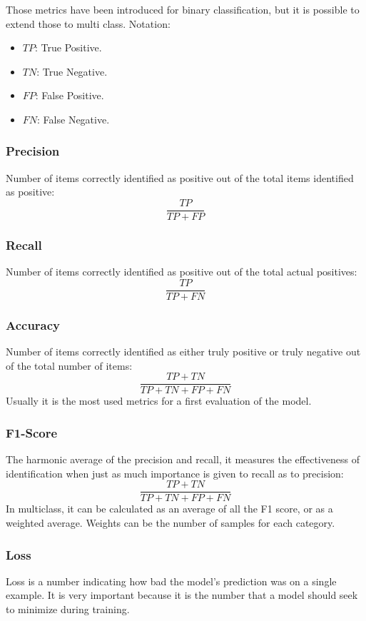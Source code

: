 Those metrics have been introduced for binary classification, but it is possible to extend those to multi class.
Notation:
\begin{itemize}
    \item $TP$: True Positive.
    \item $TN$: True Negative.
    \item $FP$: False Positive.
    \item $FN$: False Negative.
\end{itemize}
\subsubsection{Precision}
Number of items correctly identified as positive out of the total items identified as positive:
\begin{equation}
    \frac{TP}{TP+FP}
\end{equation}
\subsubsection{Recall}
Number of items correctly identified as positive out of the total actual positives:
\begin{equation}
    \frac{TP}{TP+FN}
\end{equation}
\subsubsection{Accuracy}
Number of items correctly identified as either truly positive or truly negative out of the total number of items:
\begin{equation}
    \frac{TP+TN}{TP+TN+FP+FN}
\end{equation}
Usually it is the most used metrics for a first evaluation of the model.
\subsubsection{F1-Score}
The harmonic average of the precision and recall, it measures the effectiveness of identification when just as much importance is given to recall as to precision:
\begin{equation}
    \frac{TP+TN}{TP+TN+FP+FN}
\end{equation}
In multiclass, it can be calculated as an average of all the F1 score, or as a weighted average. Weights can be the number of samples for each category.
\subsubsection{Loss}
Loss is a number indicating how bad the model's prediction was on a single example. It is very important because it is the number that a model should seek to minimize during training.

